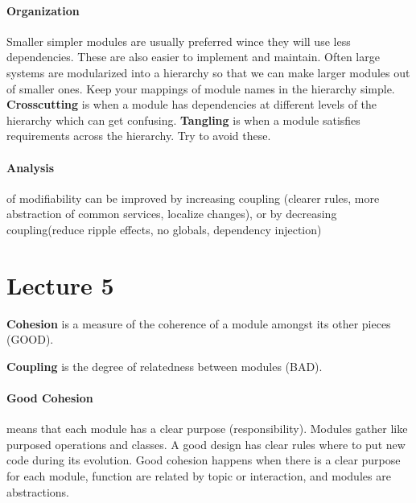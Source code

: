 \documentclass{article}
\begin{document}
\paragraph{Organization} %
\label{par:organization}
Smaller simpler modules are usually preferred wince they will use less dependencies. These are also easier to implement and maintain. Often large systems are modularized into a hierarchy so that we can make larger modules out of smaller ones. Keep your mappings of module names in the hierarchy simple. \textbf{Crosscutting} is when a module has dependencies at different levels of the hierarchy which can get confusing. \textbf{Tangling} is when a module satisfies requirements across the hierarchy. Try to avoid these.

\paragraph{Analysis} %
\label{par:analysis}
of modifiability can be improved by increasing coupling (clearer rules, more abstraction of common services, localize changes), or by decreasing coupling(reduce ripple effects, no globals, dependency injection)



\section*{Lecture 5} %
\label{sec:lecture_5}
\textbf{Cohesion} is a measure of the coherence of a module amongst its other pieces (GOOD).

\textbf{Coupling} is the degree of relatedness between modules (BAD).

\paragraph{Good Cohesion} %
\label{par:good_cohesion}
means that each module has a clear purpose (responsibility). Modules gather like purposed operations and classes. A good design has clear rules where to put new code during its evolution. Good cohesion happens when there is a clear purpose for each module, function are related by topic or interaction, and modules are abstractions.
\end{document}
